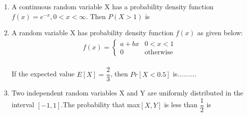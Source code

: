 \documentclass[journal,12pt,twocolumn]{IEEEtran}
\begin{document}
\begin{enumerate}
\begin{enumerate}
\end{enumerate}
%
\solution


\item A continuous random variable X has a probability density function $f(x) = e^{-x}, 0<x<\infty$. Then $P(X>1)$ is
\begin{enumerate}
\end{enumerate}
%
\solution


\item A random variable X has probability density function $f(x)$ as given below:\\
\begin{align}
f(x) =
\begin{cases}
a+bx
&  0<x<1
\\      
0
& \text{otherwise}
\end{cases}
\label{a}
\end{align}
\\
If the expected value $E[X]=\dfrac{2}{3}$, then $Pr[X<0.5]$ is..........
\\
\solution



\item Two independent random variables X and Y are uniformly distributed in the interval $[-1,1]$.The probability that max$[X,Y]$ is less than $\dfrac{1}{2}$ is

\begin{enumerate}
\begin{multicols}{4}
\setlength\itemsep{2em}


\end{multicols}
\end{enumerate}
\end{enumerate}
\end{document}
